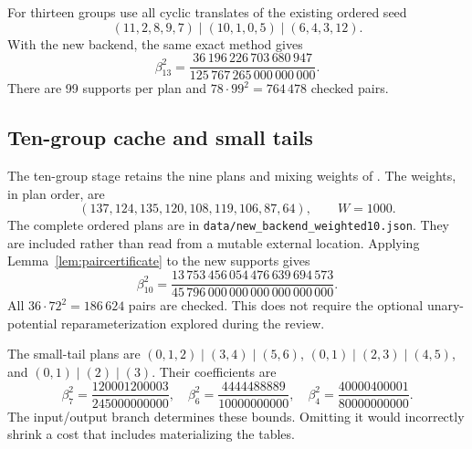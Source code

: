 For thirteen groups use all cyclic translates of the existing ordered seed
\[
 (11,2,8,9,7)\mid(10,1,0,5)\mid(6,4,3,12).
\]
With the new backend, the same exact method gives
\begin{equation}\label{eq:beta13}
 \beta_{13}^2=
 \frac{36\,196\,226\,703\,680\,947}{125\,767\,265\,000\,000\,000}.
\end{equation}
There are 99 supports per plan and $78\cdot99^2=764\,478$ checked pairs.

\subsection{Ten-group cache and small tails}

The ten-group stage retains the nine plans and mixing weights of
\cite{pairwise}. The weights, in plan order, are
\[
 (137,124,135,120,108,119,106,87,64),\qquad W=1000.
\]
The complete ordered plans are in \texttt{data/new\_backend\_weighted10.json}.
They are included rather than read from a mutable external location.
Applying Lemma~\ref{lem:paircertificate} to the new supports gives
\begin{equation}\label{eq:beta10}
 \beta_{10}^2=
 \frac{13\,753\,456\,054\,476\,639\,694\,573}
      {45\,796\,000\,000\,000\,000\,000\,000}.
\end{equation}
All $36\cdot72^2=186\,624$ pairs are checked. This does not require
the optional unary-potential reparameterization explored during the review.

The small-tail plans are $(0,1,2)\mid(3,4)\mid(5,6)$,
$(0,1)\mid(2,3)\mid(4,5)$, and $(0,1)\mid(2)\mid(3)$.
Their coefficients are
\[
 \beta_7^2=\frac{120001200003}{245000000000},\quad
 \beta_6^2=\frac{4444488889}{10000000000},\quad
 \beta_4^2=\frac{40000400001}{80000000000}.
\]
The input/output branch determines these bounds. Omitting it would
incorrectly shrink a cost that includes materializing the tables.

